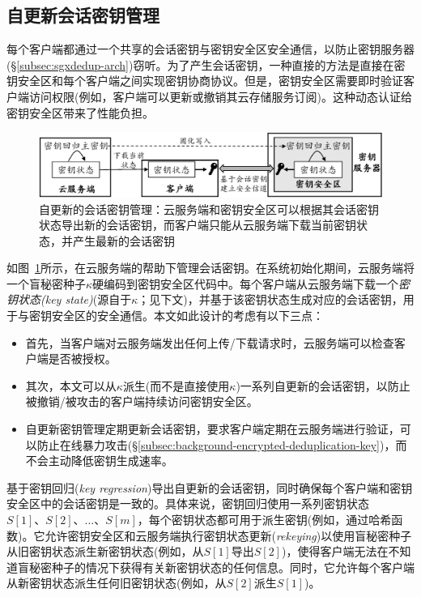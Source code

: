 \subsection{自更新会话密钥管理}
\label{subsec:sgxdedup-key-management}

每个客户端都通过一个共享的会话密钥与密钥安全区安全通信，以防止密钥服务器 (\S\ref{subsec:sgxdedup-arch})窃听。为了产生会话密钥，一种直接的方法是直接在密钥安全区和每个客户端之间实现密钥协商协议。但是，密钥安全区需要即时验证客户端访问权限(例如，客户端可以更新或撤销其云存储服务订阅)。这种动态认证给密钥安全区带来了性能负担。

\begin{figure}[!htb]
\centering
\includegraphics[width=\textwidth]{pic/sgxdedup/keyRegression.pdf}
\caption{自更新的会话密钥管理：云服务端和密钥安全区可以根据其会话密钥状态导出新的会话密钥，而客户端只能从云服务端下载当前密钥状态，并产生最新的会话密钥}
\label{fig:sgxdedup-keymanage}
\end{figure}

如图~\ref{fig:sgxdedup-keymanage}所示，\sysnameS 在云服务端的帮助下管理会话密钥。在系统初始化期间，云服务端将一个盲秘密种子$\kappa$硬编码到密钥安全区代码中。每个客户端从云服务端下载一个\textit{密钥状态(key state)}(源自于$\kappa$；见下文)，并基于该密钥状态生成对应的会话密钥，用于与密钥安全区的安全通信。本文如此设计的考虑有以下三点：
\begin{itemize}
    \item 首先，当客户端对云服务端发出任何上传/下载请求时，云服务端可以检查客户端是否被授权。
    \item 其次，本文可以从$\kappa$派生(而不是直接使用$\kappa$)一系列自更新的会话密钥，以防止被撤销/被攻击的客户端持续访问密钥安全区。
    \item 自更新密钥管理定期更新会话密钥，要求客户端定期在云服务端进行验证，可以防止在线暴力攻击(\S\ref{subsec:background-encrypted-deduplication-key})，而不会主动降低密钥生成速率\cite{bellare2013DupLESS}。
\end{itemize}

\sysnameS 基于密钥回归(\textit{key regression})\cite{fu06}导出自更新的会话密钥，同时确保每个客户端和密钥安全区中的会话密钥是一致的。具体来说，密钥回归使用一系列密钥状态$S[1]、S[2]、\ldots、S[m]$，每个密钥状态都可用于派生密钥(例如，通过哈希函数)。它允许密钥安全区和云服务端执行密钥状态更新(\textit{rekeying})以使用盲秘密种子从旧密钥状态派生新密钥状态(例如，从$S[1]$导出$S[2]$)，使得客户端无法在不知道盲秘密种子的情况下获得有关新密钥状态的任何信息。同时，它允许每个客户端从新密钥状态派生任何旧密钥状态(例如，从$S[2]$派生$S[1]$)。

